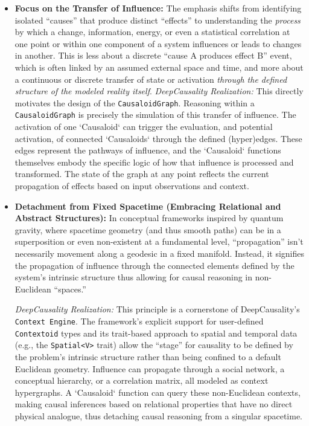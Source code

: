 \begin{itemize}
    \item \textbf{Focus on the Transfer of Influence:}
    The emphasis shifts from identifying isolated ``causes'' that produce distinct ``effects'' to understanding the \textit{process} by which a change, information, energy, or even a statistical correlation at one point or within one component of a system influences or leads to changes in another. This is less about a discrete ``cause A produces effect B'' event, which is often linked by an assumed external space and time, and more about a continuous or discrete transfer of state or activation \textit{through the defined structure of the modeled reality itself}.
    \textit{DeepCausality Realization:} This directly motivates the design of the \texttt{CausaloidGraph}. Reasoning within a \texttt{CausaloidGraph} is precisely the simulation of this transfer of influence. The activation of one `Causaloid` can trigger the evaluation, and potential activation, of connected `Causaloids` through the defined (hyper)edges. These edges represent the pathways of influence, and the `Causaloid` functions themselves embody the specific logic of how that influence is processed and transformed. The state of the graph at any point reflects the current propagation of effects based on input observations and context.

    \item \textbf{Detachment from Fixed Spacetime (Embracing Relational and Abstract Structures):}
    In conceptual frameworks inspired by quantum gravity, where spacetime geometry (and thus smooth paths) can be in a superposition or even non-existent at a fundamental level, ``propagation'' isn't necessarily movement along a geodesic in a fixed manifold. Instead, it signifies the propagation of influence through the connected elements defined by the system's intrinsic structure thus allowing for causal reasoning in non-Euclidean ``spaces.''
    
    \textit{DeepCausality Realization:} This principle is a cornerstone of DeepCausality’s \texttt{Context Engine}. The framework's explicit support for user-defined \texttt{Contextoid} types and its trait-based approach to spatial and temporal data (e.g., the \texttt{Spatial<V>} trait) allow the ``stage'' for causality to be defined by the problem’s intrinsic structure rather than being confined to a default Euclidean geometry. Influence can propagate through a social network, a conceptual hierarchy, or a correlation matrix, all modeled as context hypergraphs. A `Causaloid` function can query these non-Euclidean contexts, making causal inferences based on relational properties that have no direct physical analogue, thus detaching causal reasoning from a singular spacetime.


\end{itemize}
